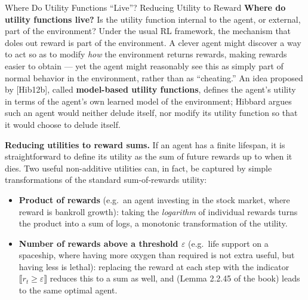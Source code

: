 \documentclass[aspectratio=169,10pt]{beamer}
\begin{document}
\begin{frame}{Where Do Utility Functions ``Live''? Reducing Utility to Reward}
  \textbf{Where do utility functions live?} Is the utility function
  internal to the agent, or external, part of the environment? Under the
  usual RL framework, the mechanism that doles out reward is part of the
  environment. A clever agent might discover a way to act so as to modify
  \emph{how} the environment returns rewards, making rewards easier to
  obtain --- yet the agent might reasonably see this as simply part of
  normal behavior in the environment, rather than as ``cheating.'' An
  idea proposed by [Hib12b], called \textbf{model-based utility
  functions}, defines the agent's utility in terms of the agent's own
  learned model of the environment; Hibbard argues such an agent would
  neither delude itself, nor modify its utility function so that it would
  choose to delude itself.

  \vspace{0.4em}
  \textbf{Reducing utilities to reward sums.} If an agent has a finite
  lifespan, it is straightforward to define its utility as the sum of
  future rewards up to when it dies. Two useful non-additive utilities
  can, in fact, be captured by simple transformations of the standard
  sum-of-rewards utility:
  \begin{itemize}
    \item \textbf{Product of rewards} (e.g.\ an agent investing in the
      stock market, where reward is bankroll growth): taking the
      \emph{logarithm} of individual rewards turns the product into a sum
      of logs, a monotonic transformation of the utility.
    \item \textbf{Number of rewards above a threshold $\varepsilon$}
      (e.g.\ life support on a spaceship, where having more oxygen than
      required is not extra useful, but having less is lethal): replacing
      the reward at each step with the indicator $\llbracket r_t\ge
      \varepsilon\rrbracket$ reduces this to a sum as well, and (Lemma
      2.2.45 of the book) leads to the same optimal agent.
  \end{itemize}
\end{frame}
\end{document}
